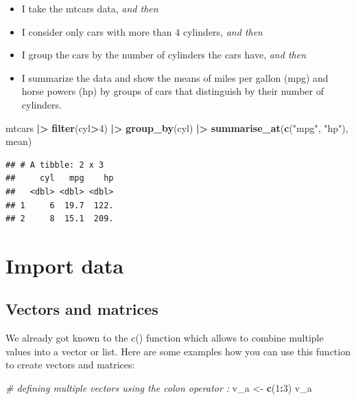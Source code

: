 \documentclass[
  12pt,
  oneside]{book}
\newenvironment{Shaded}{\begin{snugshade}}{\end{snugshade}}
\newcommand{\CommentTok}[1]{\textcolor[rgb]{0.56,0.35,0.01}{\textit{#1}}}
\newcommand{\DecValTok}[1]{\textcolor[rgb]{0.00,0.00,0.81}{#1}}
\newcommand{\FunctionTok}[1]{\textcolor[rgb]{0.13,0.29,0.53}{\textbf{#1}}}
\newcommand{\NormalTok}[1]{#1}
\newcommand{\OtherTok}[1]{\textcolor[rgb]{0.56,0.35,0.01}{#1}}
\newcommand{\SpecialCharTok}[1]{\textcolor[rgb]{0.81,0.36,0.00}{\textbf{#1}}}
\newcommand{\StringTok}[1]{\textcolor[rgb]{0.31,0.60,0.02}{#1}}
\providecommand{\tightlist}{%
  \setlength{\itemsep}{0pt}\setlength{\parskip}{0pt}}
\theoremstyle{definition}
\theoremstyle{definition}
\theoremstyle{definition}
\theoremstyle{definition}
\theoremstyle{remark}
\begin{document}
\begin{itemize}
\tightlist
\item
  I take the mtcars data, \emph{and then}
\item
  I consider only cars with more than 4 cylinders, \emph{and then}
\item
  I group the cars by the number of cylinders the cars have, \emph{and then}
\item
  I summarize the data and show the means of miles per gallon (mpg) and horse powers (hp) by groups of cars that distinguish by their number of cylinders.
\end{itemize}

\begin{Shaded}
\begin{Highlighting}[]
\NormalTok{mtcars }\SpecialCharTok{|\textgreater{}} 
  \FunctionTok{filter}\NormalTok{(cyl}\SpecialCharTok{\textgreater{}}\DecValTok{4}\NormalTok{) }\SpecialCharTok{|\textgreater{}} 
  \FunctionTok{group\_by}\NormalTok{(cyl) }\SpecialCharTok{|\textgreater{}} 
  \FunctionTok{summarise\_at}\NormalTok{(}\FunctionTok{c}\NormalTok{(}\StringTok{"mpg"}\NormalTok{, }\StringTok{"hp"}\NormalTok{), mean)}
\end{Highlighting}
\end{Shaded}

\begin{verbatim}
## # A tibble: 2 x 3
##     cyl   mpg    hp
##   <dbl> <dbl> <dbl>
## 1     6  19.7  122.
## 2     8  15.1  209.
\end{verbatim}

\hypertarget{import-data}{%
\section{Import data}\label{import-data}}

\hypertarget{vectors-and-matrices}{%
\subsection{Vectors and matrices}\label{vectors-and-matrices}}

We already got known to the c() function which allows to combine multiple values into a vector or list. Here are some examples how you can use this function to create vectors and matrices:

\begin{Shaded}
\begin{Highlighting}[]
\CommentTok{\# defining multiple vectors using the colon operator \textasciigrave{}:\textasciigrave{}}
\NormalTok{v\_a }\OtherTok{\textless{}{-}} \FunctionTok{c}\NormalTok{(}\DecValTok{1}\SpecialCharTok{:}\DecValTok{3}\NormalTok{)}
\NormalTok{v\_a}
\end{Highlighting}
\end{Shaded}
\end{document}
